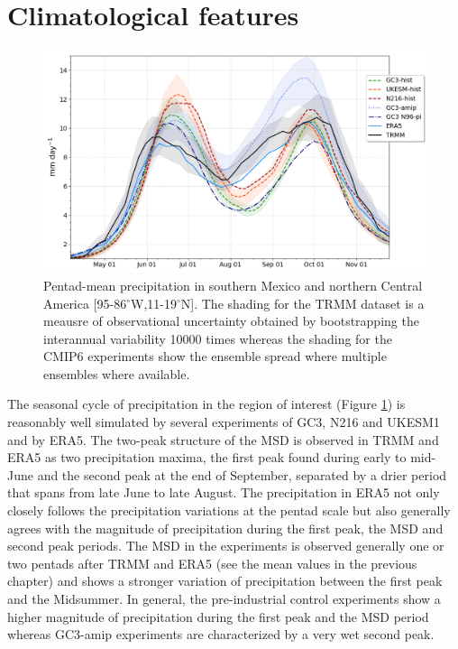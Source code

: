 \section{Climatological features}

\label{sq:msdclim}
 \begin{figure}[t!]
\includegraphics[width=\linewidth]{figures/seasonal_cycle_p3.png}
\caption{Pentad-mean precipitation in southern Mexico and northern Central America [95-86$^\circ$W,11-19$^\circ$N]. The shading for the TRMM dataset is a meausre of observational uncertainty obtained by bootstrapping the interannual variability 10000 times whereas the shading for the CMIP6 experiments show the ensemble spread where multiple ensembles where available. }
\label{fig:msdcaribb}
\end{figure}


The seasonal cycle of precipitation in the region of interest (Figure \ref{fig:msdcaribb}) is reasonably well simulated by several experiments of GC3, N216 and UKESM1 and by ERA5.
The two-peak structure of the MSD is observed in TRMM and ERA5 as two precipitation maxima, the first peak found during early to mid-June and the second peak at the end of September, separated by a drier period that spans from late June to late August. The precipitation in ERA5 not only closely follows the precipitation variations at the pentad scale but also generally agrees with the magnitude of precipitation during the first peak, the MSD and second peak periods.
The MSD in the experiments is observed generally one or two pentads after TRMM and ERA5 (see the mean values in the previous chapter) and shows a stronger variation of precipitation between the first peak and the Midsummer. 
In general, the pre-industrial control experiments show a higher magnitude of precipitation during the first peak and the MSD period whereas GC3-amip experiments are characterized by a very wet second peak. 

